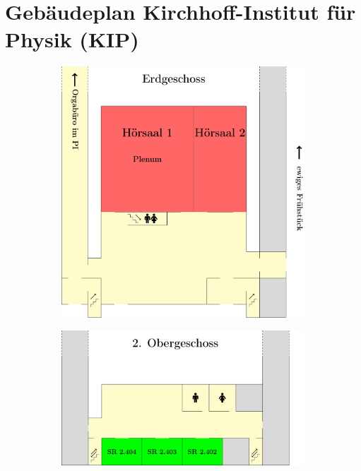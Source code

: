 \section{Gebäudeplan Kirchhoff-Institut für Physik (KIP)}
\begin{figure}[H]
\centering
\begin{subfigure}[h]{0.8\textwidth}
\centering
\includegraphics[width=\linewidth]{raumplan/eg}
\vspace*{5mm}
\end{subfigure}
\begin{subfigure}[h]{0.8\textwidth}
\centering
\includegraphics[width=\linewidth]{raumplan/og2}
\end{subfigure}
\end{figure}

